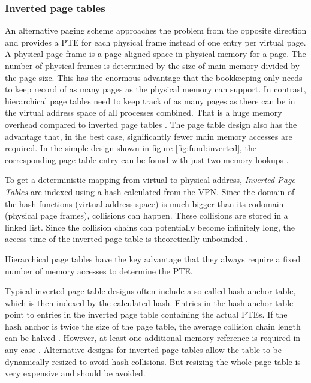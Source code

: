 \subsubsection{Inverted page tables}
An alternative paging scheme approaches the problem from the opposite direction and provides a PTE
for each physical frame instead of one entry per virtual page.
A physical page frame is a page-aligned space in physical memory for a page.
The number of physical frames is determined by the size of main memory divided by the page size.
This has the enormous advantage that the bookkeeping only needs to keep record of as many pages
as the physical memory can support.
In contrast, hierarchical page tables need to keep track of as many pages as there can be in the virtual
address space of all processes combined. That is a huge memory overhead compared to inverted page tables
\cite{jacob1998look}.
The page table design also has the advantage that, in the best case, significantly fewer main memory
accesses are required. In the simple design shown in figure \ref{fig:fund:inverted}, the corresponding
page table entry can be found with just two memory lookups \cite{skarlatos2020elastic}.

To get a deterministic mapping from virtual to physical address, \emph{Inverted Page Tables} are indexed
using a hash calculated from the VPN.
Since the domain of the hash functions (virtual address space) is much bigger than its codomain (physical page frames),
collisions can happen. These collisions are stored in a linked list. Since
the collision chains can potentially become infinitely long, the access time of the inverted page table is theoretically
unbounded \cite{tanenbaumOS}.

Hierarchical page tables have the key advantage that they always require
a fixed number of memory accesses to determine the PTE.

Typical inverted page table designs often include a so-called hash anchor table, which is then
indexed by the calculated hash. Entries in the hash anchor table point to entries in the inverted page table
containing the actual PTEs. If the hash anchor is twice the size
of the page table, the average collision chain length can be halved \cite{jacob1998virtualissues}.
However, at least one additional memory reference is required in any case \cite{jacob1998virtualissues}.
Alternative designs for inverted page tables allow the table to be dynamically resized to avoid hash collisions.
But resizing the whole page table is very expensive and should be avoided\cite{skarlatos2020elastic}.

